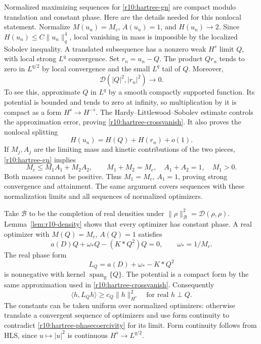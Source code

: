Normalized maximizing sequences for \eqref{r10:hartree-gn} are compact
modulo translation and constant phase. Here are the details needed
for this nonlocal statement. Normalize $M(u_n)=M_c$, $A(u_n)=1$, and
$H(u_n)\to2$. Since $H(u_n)\le C\|u_n\|_q^4$, local vanishing in
mass is impossible by the localized Sobolev inequality. A translated
subsequence has a nonzero weak $H^s$ limit $Q$, with local strong
$L^q$ convergence. Set $r_n=u_n-Q$.
The product $Qr_n$ tends to zero in $L^{q/2}$ by local convergence
and the small $L^q$ tail of $Q$.
Moreover,
\begin{equation}\label{r10:hartree-crossvanish}
 \mathcal D(|Q|^2,|r_n|^2)\longrightarrow0.
\end{equation}
To see this, approximate $Q$ in $L^q$ by a smooth compactly supported
function. Its potential is bounded and tends to zero at infinity,
so multiplication by it is compact as a form $H^s\to H^{-s}$.
The Hardy--Littlewood--Sobolev estimate controls the approximation
error, proving \eqref{r10:hartree-crossvanish}. It also proves the
nonlocal splitting
\[
 H(u_n)=H(Q)+H(r_n)+o(1).
\]
If $M_j,A_j$ are the limiting mass and kinetic contributions of the
two pieces, \eqref{r10:hartree-gn} implies
\[
 M_c\le M_1A_1+M_2A_2,
 \qquad M_1+M_2=M_c,\quad A_1+A_2=1,\quad M_1>0.
\]
Both masses cannot be positive. Thus $M_1=M_c$, $A_1=1$, proving
strong convergence and attainment. The same argument covers
sequences with these normalization limits and all sequences of
normalized optimizers.

Take $\mathcal B$ to be the completion of real densities under
$\|\rho\|_{\mathcal B}^2=\mathcal D(\rho,\rho)$.
Lemma~\ref{lem:r10-density} shows that every optimizer has constant
phase. A real optimizer with $M(Q)=M_c$, $A(Q)=1$ satisfies
\[
 a(D)Q+\omega_*Q-(K*Q^2)Q=0,\qquad \omega_*=1/M_c.
\]
The real phase form
\[
 L_Q=a(D)+\omega_*-K*Q^2
\]
is nonnegative with kernel $\operatorname{span}_{\mathbb R}\{Q\}$.
The potential is a compact form by the same approximation used in
\eqref{r10:hartree-crossvanish}. Consequently
\begin{equation}\label{r10:hartree-phasecoercivity}
 \langle h,L_Qh\rangle\ge c_Q\|h\|_{H^s}^2
 \quad\text{for real }h\perp Q.
\end{equation}
The constants can be taken uniform over normalized optimizers:
otherwise translate a convergent sequence of optimizers and use
form continuity to contradict \eqref{r10:hartree-phasecoercivity}
for its limit. Form continuity follows from HLS, since
$u\mapsto |u|^2$ is continuous $H^s\to L^{q/2}$.

